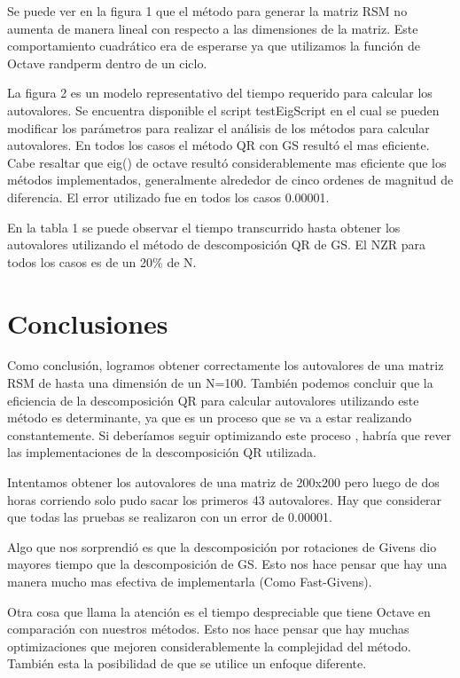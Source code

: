 \documentclass[a4paper,10pt,spanish]{article}
\begin{document}
Se puede ver en la figura 1 que el método para generar la matriz RSM no aumenta de manera lineal con respecto a las dimensiones de la matriz. Este comportamiento cuadrático era de esperarse ya que utilizamos la función de Octave randperm dentro de un ciclo.


La figura 2 es un modelo representativo del tiempo requerido para calcular los autovalores. Se encuentra disponible el script testEigScript en el cual se pueden modificar los parámetros para realizar el análisis de los métodos para calcular autovalores. En todos los casos el método QR con GS resultó el mas eficiente. Cabe resaltar que eig() de octave resultó considerablemente mas eficiente que los métodos implementados, generalmente alrededor de cinco ordenes de magnitud de diferencia. El error utilizado fue en todos los casos 0.00001.

En la tabla 1 se puede observar el tiempo transcurrido hasta obtener los autovalores utilizando el método de descomposición QR de GS. El NZR para todos los casos es de un 20\% de N.

\pagebreak

\section{Conclusiones}
Como conclusión, logramos obtener correctamente los autovalores de una matriz RSM de hasta una dimensión de un N=100. También podemos concluir que la eficiencia de la descomposición QR para calcular autovalores utilizando este método es determinante, ya que es un proceso que se va a estar realizando constantemente. Si deberíamos seguir optimizando este proceso , habría que rever las implementaciones de la descomposición QR utilizada.

Intentamos obtener los autovalores de una matriz de 200x200 pero luego de dos horas corriendo solo pudo sacar los primeros 43 autovalores. Hay que considerar que todas las pruebas se realizaron con un error de 0.00001.

Algo que nos sorprendió es que la descomposición por rotaciones de Givens dio mayores tiempo que la descomposición de GS. Esto nos hace pensar que hay una manera mucho mas efectiva de implementarla (Como Fast-Givens).

Otra cosa que llama la atención es el tiempo despreciable que tiene Octave en comparación con nuestros métodos. Esto nos hace pensar que hay muchas optimizaciones que mejoren considerablemente la complejidad del método. También esta la posibilidad de que se utilice un enfoque diferente.
\end{document}
